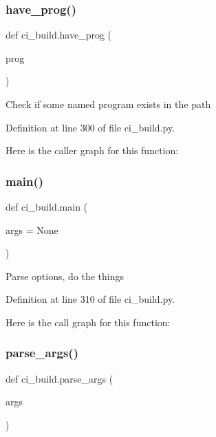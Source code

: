 \subsubsection{\texorpdfstring{have\+\_\+prog()}{have\_prog()}}
{\footnotesize\ttfamily def ci\+\_\+build.\+have\+\_\+prog (\begin{DoxyParamCaption}\item[{}]{prog }\end{DoxyParamCaption})}

\begin{DoxyVerb}Check if some named program exists in the path
\end{DoxyVerb}
 

Definition at line 300 of file ci\+\_\+build.\+py.

Here is the caller graph for this function\+:
\mbox{\label{namespaceci__build_a13eee9a40af248919a1ecdbd4ff144d4}} 
\subsubsection{\texorpdfstring{main()}{main()}}
{\footnotesize\ttfamily def ci\+\_\+build.\+main (\begin{DoxyParamCaption}\item[{}]{args = {\ttfamily None} }\end{DoxyParamCaption})}

\begin{DoxyVerb}Parse options, do the things
\end{DoxyVerb}
 

Definition at line 310 of file ci\+\_\+build.\+py.

Here is the call graph for this function\+:
\mbox{\label{namespaceci__build_aa28115b3f14a76c39748bf34ec2f92f4}} 
\subsubsection{\texorpdfstring{parse\+\_\+args()}{parse\_args()}}
{\footnotesize\ttfamily def ci\+\_\+build.\+parse\+\_\+args (\begin{DoxyParamCaption}\item[{}]{args }\end{DoxyParamCaption})}


